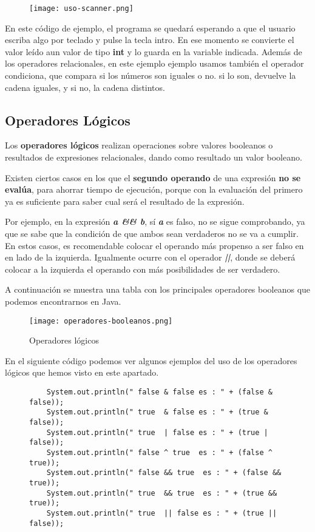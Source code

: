 \begin{figure}[H]
    \texttt{[image: uso-scanner.png]}
\end{figure}

En este código de ejemplo, el programa se quedará esperando a que el usuario escriba algo por teclado y pulse la tecla intro. En ese momento se convierte el valor leído aun valor de tipo \textbf{int} y lo guarda en la variable indicada. Además de los operadores relacionales, en este ejemplo ejemplo usamos también el operador condiciona, que compara si los números son iguales o no. si lo son, devuelve la cadena iguales, y si no, la cadena distintos.

\subsection{Operadores Lógicos}
Los \textbf{operadores lógicos} realizan operaciones sobre valores booleanos o resultados de expresiones relacionales, dando como resultado un valor booleano.

Existen ciertos casos en los que el \textbf{segundo operando} de una expresión \textbf{no se evalúa}, para ahorrar tiempo de ejecución, porque con la evaluación del primero ya es suficiente para saber cual será el resultado de la expresión.

Por ejemplo, en la expresión \textbf{\textit{a \&\& b}}, sí \textbf{\textit{a}} es falso, no se sigue comprobando, ya que se sabe que la condición de que ambos sean verdaderos no se va a cumplir. En estos casos, es recomendable colocar el operando más propenso a ser falso en en lado de la izquierda. Igualmente ocurre con el operador \textbf{\textit{||}}, donde se deberá colocar a la izquierda el operando con más posibilidades de ser verdadero.

A continuación se muestra una tabla con los principales operadores booleanos que podemos encontrarnos en Java.

\begin{figure}[H]
    \centering
    \texttt{[image: operadores-booleanos.png]}
    \caption{Operadores lógicos}
\end{figure}

En el siguiente código podemos ver algunos ejemplos del uso de los operadores lógicos que hemos visto en este apartado.

\begin{figure}[H]
    \begin{tcolorbox}[sharp corners, colback=yellow!30, colframe=white!20]
        \scriptsize
\begin{verbatim}
    System.out.println(" false & false es : " + (false & false));
    System.out.println(" true  & false es : " + (true & false));
    System.out.println(" true  | false es : " + (true | false));
    System.out.println(" false ^ true  es : " + (false ^ true));
    System.out.println(" false && true  es : " + (false && true));
    System.out.println(" true  && true  es : " + (true && true));
    System.out.println(" true  || false es : " + (true || false));
\end{verbatim}
    \end{tcolorbox}
\end{figure}

